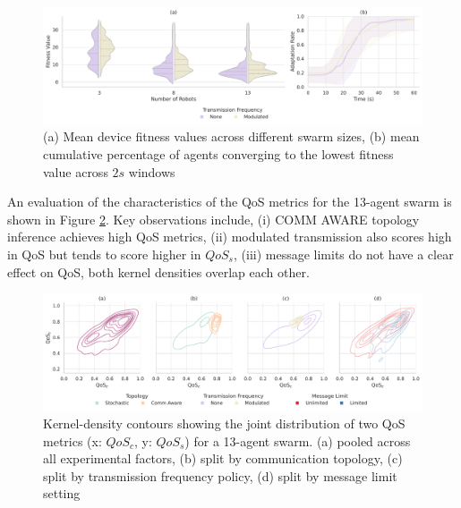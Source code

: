 \documentclass[conference]{IEEEtran}
\begin{document}
\begin{figure}[h]
    \centering
    \includegraphics[width=1\textwidth]{f_performance_impact.pdf}
    \caption{(a) Mean device fitness values across different swarm sizes, (b) mean cumulative percentage of agents converging to the lowest fitness value across $2s$ windows}
    \label{fig:f-performance}
\end{figure}

An evaluation of the characteristics of the QoS metrics for the 13-agent swarm is shown in Figure \ref{fig:qos}. Key observations include, (i) COMM AWARE topology inference achieves high QoS metrics, (ii) modulated transmission also scores high in QoS but tends to score higher in $QoS_s$, (iii) message limits do not have a clear effect on QoS, both kernel densities overlap each other.

\begin{figure}[h]
    \centering
    \includegraphics[width=1\textwidth]{qos_impact.pdf}
    \caption{Kernel-density contours showing the joint distribution of two QoS metrics (x: $QoS_c$, y: $QoS_s$) for a 13-agent swarm. (a) pooled across all experimental factors, (b) split by communication topology, (c) split by transmission frequency policy, (d) split by message limit setting}
    \label{fig:qos}
\end{figure}
\end{document}
